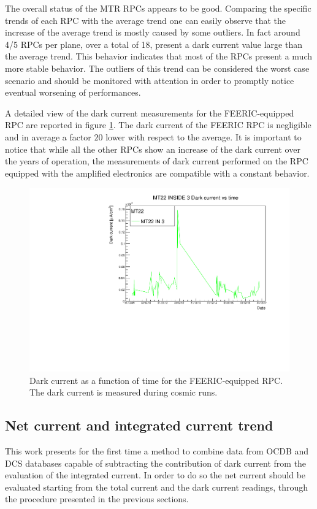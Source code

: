 The overall status of the MTR RPCs appears to be good.
Comparing the specific trends of each RPC with the average trend one can easily observe that the increase of the average trend is mostly caused by some outliers.
In fact around 4/5 RPCs per plane, over a total of 18, present a dark current value large than the average trend.
This behavior indicates that most of the RPCs present a much more stable behavior.
The outliers of this trend can be considered the worst case scenario and should be monitored with attention in order to promptly notice eventual worsening of performances.

A detailed view of the dark current measurements for the FEERIC-equipped RPC are reported in figure \ref{fig:FEERICiDark}.
The dark current of the FEERIC RPC is negligible and in average a factor $20$ lower with respect to the average.
It is important to notice that while all the other RPCs show an increase of the dark current over the years of operation, the measurements of dark current performed on the RPC equipped with the amplified electronics are compatible with a constant behavior.

\begin{figure}[!t]
\begin{center}
\includegraphics[width=0.95\linewidth]{Chapters/Performance/Figs/iDarkFEERIC.pdf}
\caption{Dark current as a function of time for the FEERIC-equipped RPC. The dark current is measured during cosmic runs.}
\label{fig:FEERICiDark}
\end{center}
\end{figure}

\subsection{Net current and integrated current trend}
This work presents for the first time a method to combine data from OCDB and DCS databases capable of subtracting the contribution of dark current from the evaluation of the integrated current.
In order to do so the net current should be evaluated starting from the total current and the dark current readings, through the procedure presented in the previous sections.

